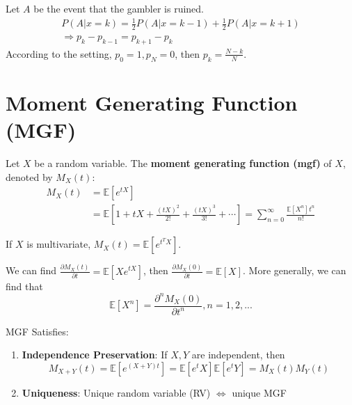 \documentclass[11pt]{elegantbook}
\begin{document}
Let $A$ be the event that the gambler is ruined.
\begin{equation}
    \begin{aligned}
        P(A|x=k)=\frac{1}{2}P(A|x=k-1)+\frac{1}{2}P(A|x=k+1)\\
        \Rightarrow p_k-p_{k-1}=p_{k+1}-p_k
    \end{aligned}
    \nonumber
\end{equation}
According to the setting, $p_0=1,p_N=0$, then $p_k=\frac{N-k}{N}$.

\section{Moment Generating Function (MGF)}
\begin{definition}
    \normalfont
    Let $X$ be a random variable. The \textbf{moment generating function (mgf)} of $X$, denoted by $M_X(t)$:
    \begin{equation}
        \begin{aligned}
            M_X(t)&=\mathbb{E}[e^{tX}]\\&=\mathbb{E}\left[1+tX+\frac{(tX)^2}{2!}+\frac{(tX)^3}{3!}+\cdots\right]=\sum_{n=0}^\infty\frac{\mathbb{E}[X^n]t^n}{n!}
        \end{aligned}
        \nonumber
    \end{equation}
    \begin{note}
        If $X$ is multivariate, $M_X(t)=\mathbb{E}[e^{t^TX}]$.
    \end{note}
\end{definition}
We can find $\frac{\partial M_X(t)}{\partial t}= \mathbb{E}\left[Xe^{tX}\right]$, then $\frac{\partial M_X(0)}{\partial t}= \mathbb{E}\left[X\right]$. More generally, we can find that $$\mathbb{E}\left[X^n\right]=\frac{\partial^n M_X(0)}{\partial t^n},n=1,2,...$$
\begin{proposition}
    MGF Satisfies:
    \begin{enumerate}
        \item \textbf{Independence Preservation}: If $X,Y$ are independent, then $$M_{X+Y}(t)=\mathbb{E}[e^{(X+Y)t}]=\mathbb{E}[e^tX]\mathbb{E}[e^tY]=M_X(t)M_Y(t)$$
        \item \textbf{Uniqueness}: Unique random variable (RV) $\Leftrightarrow$ unique MGF
    \end{enumerate}
\end{proposition}
\end{document}
